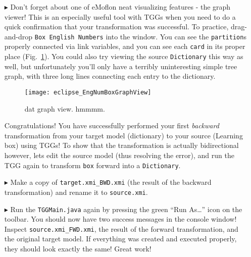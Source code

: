 \begin{itemize}
\clearpage

\item[$\blacktriangleright$] Don't forget about one of eMoflon neat visualizing features - the graph viewer! This is an especially useful tool with TGGs when
you need to do a quick confirmation that your transformation was successful. To practice, drag-and-drop \texttt{Box English Numbers} into the window. You can
see the \texttt{partition}s properly connected via link variables, and you can see each \texttt{card} in its proper place (Fig.~\ref{fig:graphViewBox}). You
could also try viewing the source \texttt{Dictionary} this way as well, but unfortunately you'll only have a terribly uninteresting simple tree graph, with
three long lines connecting each entry to the dictionary.

\begin{figure}[htbp]
\begin{center}
  \texttt{[image: eclipse\_EngNumBoxGraphView]}
  \caption{dat graph view. hmmmm.}
  \label{fig:graphViewBox}
\end{center}
\end{figure}


\vspace{0.5cm}

Congratulations! You have successfully performed your first \emph{backward} transformation from your target model (dictionary) to your source (Learning box)
using TGGs! To show that the transformation is actually bidirectional however, lets edit the source model (thus resolving the error), and run the TGG again to
transform \texttt{box} forward into a \texttt{Dictionary}.


\item[$\blacktriangleright$] Make a copy of \texttt{target.xmi\_BWD.xmi} (the result of the backward transformation)
and rename it to \texttt{source.xmi}.
  

\item[$\blacktriangleright$] Run the \texttt{TGGMain.java} again by pressing the green ``Run As\ldots'' icon on the toolbar. You should now have two success
messages in the console window! Inspect \texttt{source.xmi\_FWD.xmi}, the result of the forward transformation, and the original target model. If everything was
created and executed properly, they should look exactly the same! Great work!

\end{itemize}
